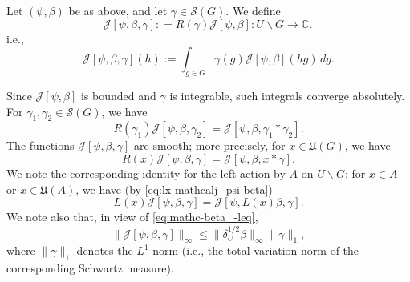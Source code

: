 \begin{definition}
  Let $(\psi,\beta)$ be as above, and let $\gamma \in \mathcal{S}(G)$.  We define  
  \begin{equation*}
    \mathcal{J}[\psi,\beta,\gamma] : = R(\gamma) \mathcal{J}[\psi,\beta] : U \backslash G \rightarrow \mathbb{C},
  \end{equation*}
  i.e.,
  \begin{equation}\label{eq:cuml2ory7z}
    \mathcal{J}[\psi,\beta,\gamma](h) :=
    \int_{g \in G}
    \gamma(g) \mathcal{J}[\psi,\beta](h g) \, d g.
  \end{equation}
\end{definition}
Since $\mathcal{J}[\psi,\beta]$ is bounded and $\gamma$ is integrable, such integrals converge absolutely.  For $\gamma_1, \gamma_2 \in \mathcal{S}(G)$, we have
\begin{equation}\label{eq:rgamm-mathc-beta}
  R(\gamma_1) \mathcal{J}[\psi,\beta,\gamma_2]
  = \mathcal{J}[\psi,\beta,\gamma_1 \ast \gamma_2].
\end{equation}
The functions $\mathcal{J}[\psi,\beta,\gamma]$ are smooth; more precisely, for $x \in \mathfrak{U}(G)$, we have
\begin{equation}\label{eq:rx-mathcald_psi-beta}
  R(x) \mathcal{J}[\psi,\beta,\gamma] = \mathcal{J}[\psi,\beta,x \ast  \gamma].
\end{equation}
We note the corresponding identity for the left action by $A$ on $U \backslash G$: for $x \in A$ or $x \in \mathfrak{U}(A)$, we have (by \eqref{eq:lx-mathcalj_psi-beta})
\begin{equation}\label{eq:lx-mathcald_psi-beta}
  L(x) \mathcal{J}[\psi,\beta,\gamma] = \mathcal{J}[\psi,L(x) \beta, \gamma].
\end{equation}
We note also that, in view of \eqref{eq:mathc-beta_-leq},
\begin{equation}\label{eq:mathc-beta-gamm}
  \|\mathcal{J}[\psi,\beta,\gamma]\|_{\infty} \leq
  \|\delta_U^{1/2} \beta \|_{\infty} \|\gamma \|_{1},
\end{equation}
where $\|\gamma \|_1$ denotes the $L^1$-norm (i.e., the total variation norm of the corresponding Schwartz measure).

